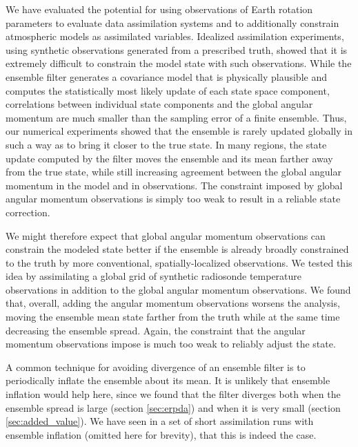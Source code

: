 
We have evaluated the potential for using observations of Earth rotation parameters to evaluate data assimilation systems and to additionally constrain atmospheric models as assimilated variables.  
Idealized assimilation experiments, using synthetic observations generated from a prescribed truth, showed that it is extremely difficult to constrain the model state with such observations.  
While the ensemble filter generates a covariance model that is physically plausible and computes the statistically most likely update of each state space component, correlations between individual state components and the global angular momentum are much smaller than the sampling error of a finite ensemble. 
Thus, our numerical experiments showed that the ensemble is rarely updated globally in such a way as to bring it closer to the true state. 
In many regions, the state update computed by the filter moves the ensemble and its mean farther away from the true state, while still increasing agreement between the global angular momentum in the model and in observations. 
The constraint imposed by global angular momentum observations is simply too weak to result in a reliable state correction. 

We might therefore expect that global angular momentum observations can constrain the modeled state better if the ensemble is already broadly constrained to the truth by more conventional, spatially-localized observations. 
We tested this idea by assimilating a global grid of synthetic radiosonde temperature observations in addition to the global angular momentum observations. 
We found that, overall, adding the angular momentum observations worsens the analysis, moving the ensemble mean state farther from the truth while at the same time decreasing the ensemble spread.
Again, the constraint that the angular momentum observations impose is much too weak to reliably adjust the state.

A common technique for avoiding divergence of an ensemble filter is to periodically inflate the ensemble about its mean. 
It is unlikely that ensemble inflation would help here, since we found that the filter diverges both when the ensemble spread is large (section \ref{sec:erpda}) and when it is very small (section \ref{sec:added_value}). 
We have seen in a set of short assimilation runs with ensemble inflation (omitted here for brevity), that this is indeed the case. 


